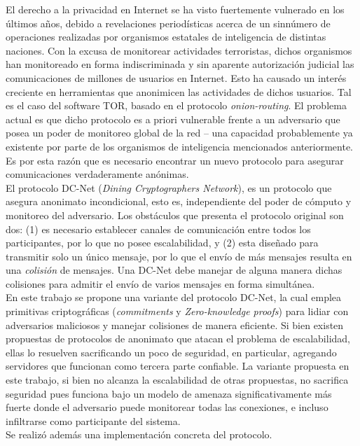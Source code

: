 El derecho a la privacidad en Internet se ha visto fuertemente 
vulnerado en los últimos años, debido a revelaciones period\'isticas acerca de un 
sinnúmero de operaciones realizadas por organismos estatales de inteligencia
de distintas naciones.
Con la excusa de monitorear actividades terroristas, dichos organismos 
han monitoreado en forma indiscriminada y sin aparente autorizaci\'on judicial 
las comunicaciones de millones de usuarios en Internet. Esto ha causado un inter\'es creciente en  
herramientas que anonimicen las actividades 
de dichos usuarios. 
Tal es el caso del software TOR, basado en el 
protocolo \emph{onion-routing}. El problema actual es que 
dicho protocolo es a priori vulnerable frente a un adversario que posea 
un poder de monitoreo global de la red -- una capacidad probablemente ya existente 
por parte de los organismos de inteligencia mencionados anteriormente. Es 
por esta razón que es necesario encontrar un nuevo protocolo 
para asegurar comunicaciones verdaderamente anónimas.\\
El protocolo DC-Net (\emph{Dining Cryptographers Network}), 
es un protocolo que asegura anonimato incondicional, esto es, independiente 
del poder de cómputo y monitoreo del adversario. Los obstáculos 
que presenta el protocolo original son dos: (1) es necesario establecer 
canales de comunicación entre todos los participantes, por lo 
que no posee escalabilidad, y (2) esta diseñado para transmitir 
solo un \'unico mensaje, por lo que el envío de más mensajes resulta 
en una \emph{colisión} de mensajes. Una DC-Net debe manejar de alguna manera dichas colisiones
para admitir el envío de varios mensajes en forma simult\'anea.\\
En este trabajo se propone una variante del protocolo DC-Net, 
la cual emplea primitivas criptográficas (\emph{commitments} y 
\emph{Zero-knowledge proofs}) para lidiar con adversarios 
maliciosos y manejar colisiones de manera eficiente. 
Si bien existen propuestas de protocolos de anonimato que atacan el problema 
de escalabilidad, ellas lo resuelven sacrificando un poco de seguridad, en particular,
agregando servidores que funcionan como tercera parte confiable. 
La variante propuesta en este trabajo, si bien no alcanza la 
escalabilidad de otras propuestas, no sacrifica seguridad pues
funciona bajo un modelo de amenaza significativamente m\'as fuerte donde el
adversario puede monitorear todas las conexiones, e incluso 
infiltrarse como participante del sistema.\\
Se realizó además una implementación concreta del protocolo.
